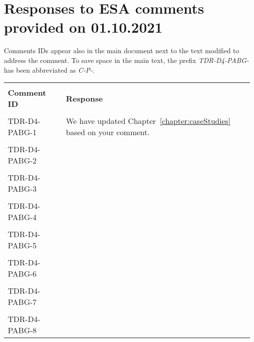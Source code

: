 
\section{Responses to ESA comments provided on 01.10.2021}
\label{sec:ESA:comments:1}

Comments IDs appear also in the main document next to the text modified to address the comment. To save space in the main text, the prefix \emph{TDR-D4-PABG-} has been abbreviated as \emph{C-P-}.

\setlength\LTleft{0pt}
\setlength\LTright{0pt}
\tiny 
\begin{longtable}{|p{2cm}|p{12cm}|@{}} 
\hline
\\
\textbf{Comment ID}&\textbf{Response}\\
\\
\hline
TDR-D4-PABG-1&
\begin{minipage}{12cm}
We have updated Chapter~\ref{chapter:caseStudies} based on your comment.
\end{minipage}\\
\\
\hline  
TDR-D4-PABG-2&
\begin{minipage}{12cm}
\end{minipage}\\
\\
\hline  
TDR-D4-PABG-3&
\begin{minipage}{12cm}
\end{minipage}\\
\\
\hline  
TDR-D4-PABG-4&
\begin{minipage}{12cm}
\end{minipage}\\
\\
\hline  
TDR-D4-PABG-5&
\begin{minipage}{12cm}
\end{minipage}\\
\\
\hline  
TDR-D4-PABG-6&
\begin{minipage}{12cm}
\end{minipage}\\
\\
\hline  
TDR-D4-PABG-7&
\begin{minipage}{12cm}
\end{minipage}\\
\\
\hline  
TDR-D4-PABG-8&
\begin{minipage}{12cm}

\end{minipage}
\end{longtable}
